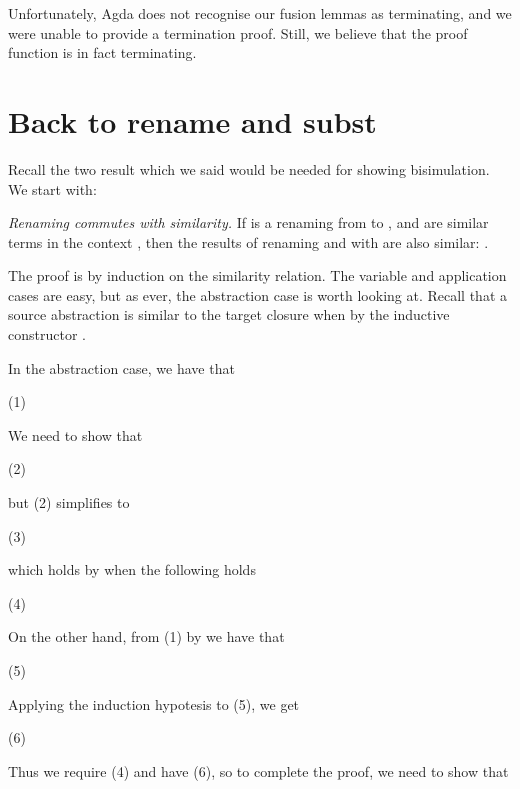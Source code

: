 \documentclass[bsc,frontabs,twoside,singlespacing,parskip,deptreport]{infthesis}
\theoremstyle{definition}
\begin{document}
Unfortunately, Agda does not recognise our fusion lemmas as
terminating, and we were unable to provide a termination proof. Still,
we believe that the proof function is in fact terminating.

\section{Back to \ti rename and \ti subst}

Recall the two result which we said would be needed for showing
bisimulation. We start with:

\textit{Renaming commutes with similarity.} If  is a renaming from
 to , and  are similar terms in the context
, then the results of renaming  and  with 
are also similar: .


The proof is by induction on the similarity relation. The variable and
application cases are easy, but as ever, the abstraction case is worth
looking at. Recall that a source abstraction is similar to the target
closure  when 
by the inductive constructor .

In the abstraction case, we have that

 (1)

We need to show that

 (2)

but (2) simplifies to

 (3)

which holds by  when the following holds

 (4)

On the other hand, from (1) by  we have that

 (5)

Applying the induction hypotesis to (5), we get

 (6)

Thus we require (4) and have (6), so to complete the proof, we need to
show that 

\end{document}
